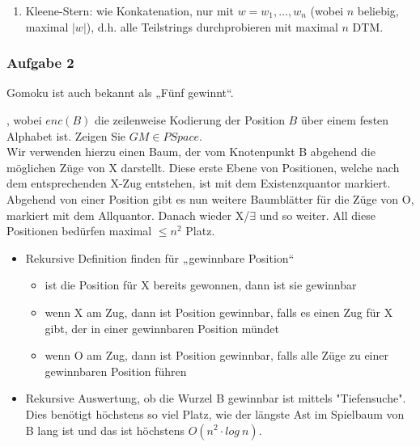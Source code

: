 \begin{enumerate}
        \item Kleene-Stern: wie Konkatenation, nur mit $w=w_{1},\dots,w_{n}$ (wobei $n$ beliebig, maximal $|w|$), d.h. alle Teilstrings durchprobieren mit maximal $n$ DTM.
    \end{enumerate}


\subsubsection*{Aufgabe 2}
    Gomoku ist auch bekannt als „Fünf gewinnt“.


    , wobei $enc(B)$ die zeilenweise Kodierung der Position $B$ über einem festen Alphabet ist. Zeigen Sie $GM \in PSpace$. \\

    \LOES Wir verwenden hierzu einen Baum, der vom Knotenpunkt B abgehend die möglichen Züge von X darstellt. Diese erste Ebene von Positionen, welche nach dem entsprechenden X-Zug entstehen, ist mit dem Existenzquantor markiert. Abgehend von einer Position gibt es nun weitere Baumblätter für die Züge von O, markiert mit dem Allquantor. Danach wieder X/$\exists$ und so weiter. All diese Positionen bedürfen maximal $\leq n^{2}$ Platz.
    \begin{itemize}
        \item Rekursive Definition finden für „gewinnbare Position“
            \begin{itemize}
                \item ist die Position für X bereits gewonnen, dann ist sie gewinnbar
                \item wenn X am Zug, dann ist Position gewinnbar, falls es einen Zug für X gibt, der in einer gewinnbaren Position mündet
                \item wenn O am Zug, dann ist Position gewinnbar, falls alle Züge zu einer gewinnbaren Position führen
            \end{itemize}

        \item Rekursive Auswertung, ob die Wurzel B gewinnbar ist mittels "Tiefensuche". Dies benötigt höchstens so viel Platz, wie der längste Ast im Spielbaum von B lang ist und das ist höchstens $O(n^{2} \cdot log\ n)$.

    \end{itemize}


